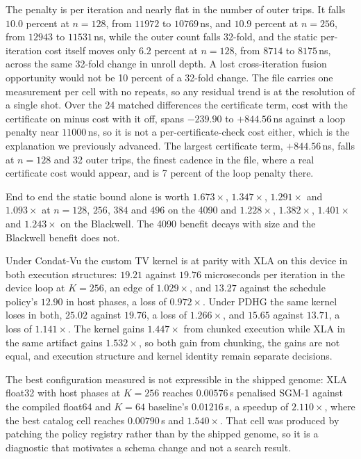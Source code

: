 The penalty is per iteration and nearly flat in the number of outer trips. It
falls $10.0$ percent at $n=128$, from $11972$ to $10769$\,ns, and $10.9$ percent
at $n=256$, from $12943$ to $11531$\,ns, while the outer count falls 32-fold,
and the static per-iteration cost itself moves only $6.2$ percent at $n=128$,
from $8714$ to $8175$\,ns, across the same 32-fold change in unroll depth. A
lost cross-iteration fusion opportunity would not be 10 percent of a 32-fold
change. The file carries one measurement per cell with no repeats, so any
residual trend is at the resolution of a single shot. Over the 24 matched
differences the certificate term, cost with the certificate on minus cost with
it off, spans $-239.90$ to $+844.56$\,ns against a loop penalty near
$11000$\,ns, so it is not a per-certificate-check cost either, which is the
explanation we previously advanced. The largest certificate term, $+844.56$\,ns,
falls at $n=128$ and 32 outer trips, the finest cadence in the file, where a
real certificate cost would appear, and is 7 percent of the loop penalty there.

End to end the static bound alone is worth $1.673\times$, $1.347\times$,
$1.291\times$ and $1.093\times$ at $n=128$, $256$, $384$ and $496$ on the 4090
and $1.228\times$, $1.382\times$, $1.401\times$ and $1.243\times$ on the
Blackwell. The 4090 benefit decays with size and the Blackwell benefit does
not.

Under Condat-Vu the custom TV kernel is at parity with XLA on this device in
both execution structures: $19.21$ against $19.76$ microseconds per iteration in
the device loop at $K=256$, an edge of $1.029\times$, and $13.27$ against the
schedule policy's $12.90$ in host phases, a loss of $0.972\times$. Under PDHG
the same kernel loses in both, $25.02$ against $19.76$, a loss of
$1.266\times$, and $15.65$ against $13.71$, a loss of $1.141\times$. The kernel
gains $1.447\times$ from chunked execution while XLA in the same artifact gains
$1.532\times$, so both gain from chunking, the gains are not equal, and
execution structure and kernel identity remain separate decisions.

The best configuration measured is not expressible in the shipped genome: XLA
float32 with host phases at $K=256$ reaches $0.00576$\,s penalised SGM-1 against
the compiled float64 and $K=64$ baseline's $0.01216$\,s, a speedup of
$2.110\times$, where the best catalog cell reaches $0.00790$\,s and
$1.540\times$. That cell was produced by patching the policy registry rather
than by the shipped genome, so it is a diagnostic that motivates a schema
change and not a search result.

